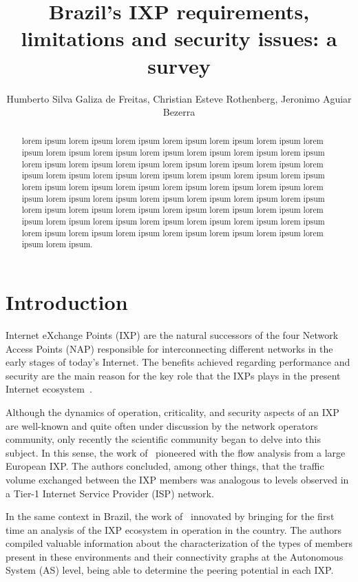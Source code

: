 \documentclass[12pt]{article}
\title{Brazil's IXP requirements, limitations and security issues: a survey}
\author{Humberto Silva Galiza de Freitas\inst{1}, Christian Esteve Rothenberg\inst{2}, Jeronimo Aguiar Bezerra\inst{3}}
\begin{document}
 

\maketitle

\begin{abstract}
lorem ipsum lorem ipsum lorem ipsum lorem ipsum lorem ipsum lorem ipsum lorem ipsum lorem ipsum lorem ipsum lorem ipsum lorem ipsum lorem ipsum lorem ipsum lorem ipsum lorem ipsum lorem ipsum lorem ipsum lorem ipsum lorem ipsum lorem ipsum lorem ipsum lorem ipsum lorem ipsum lorem ipsum lorem ipsum lorem ipsum lorem ipsum lorem ipsum lorem ipsum lorem ipsum lorem ipsum lorem ipsum lorem ipsum lorem ipsum lorem ipsum lorem ipsum lorem ipsum lorem ipsum lorem ipsum lorem ipsum lorem ipsum lorem ipsum lorem ipsum lorem ipsum lorem ipsum lorem ipsum lorem ipsum lorem ipsum lorem ipsum lorem ipsum lorem ipsum lorem ipsum lorem ipsum lorem ipsum lorem ipsum lorem ipsum lorem ipsum lorem ipsum lorem ipsum lorem ipsum.

\end{abstract}

\section{Introduction}

Internet eXchange Points (IXP) are the natural successors of the four Network Access Points (NAP) responsible for interconnecting different networks in the early stages of today's Internet. The benefits achieved regarding performance and security are the main reason for the key role that the IXPs plays in the present Internet ecosystem~\cite{norton20142014}.

Although the dynamics of operation, criticality, and security aspects of an IXP are well-known and quite often under discussion by the network operators community, only recently the scientific community began to delve into this subject. In this sense, the work of~\cite{ager2012anatomy} pioneered with the flow analysis from a large European IXP. The authors concluded, among other things, that the traffic volume exchanged between the IXP members was analogous to levels observed in a Tier-1 Internet Service Provider (ISP) network. 

In the same context in Brazil, the work of~\cite{brito2015anatomia} innovated by bringing for the first time an analysis of the IXP ecosystem in operation in the country. The authors compiled valuable information about the characterization of the types of members present in these environments and their connectivity graphs at the Autonomous System (AS) level, being able to determine the peering potential in each IXP. 
\end{document}
